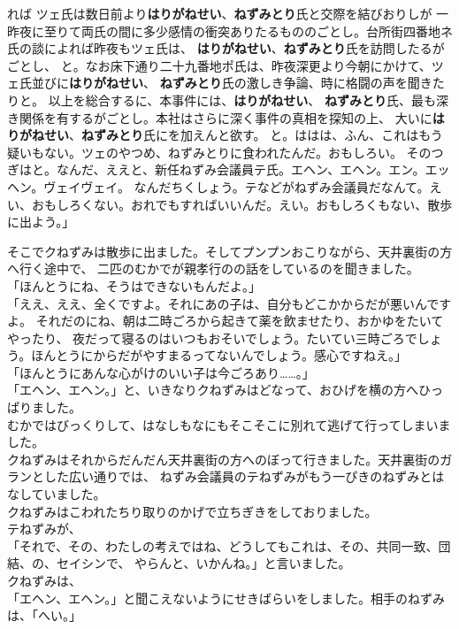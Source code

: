 \documentclass[
    a4paper,
    10pt,
    book]
    {tarticle}
\begin{document}
\newpage
\thispagestyle{fancy}
\fancyhead[R]{\empty}
れば
ツェ氏は数日前より\textbf{はりがねせい}、\textbf{ねずみとり}氏と交際を結びおりしが
一昨夜に至りて両氏の間に多少感情の衝突ありたるもののごとし。台所街四番地ネ氏の談によれば昨夜もツェ氏は、
\textbf{はりがねせい}、\textbf{ねずみとり}氏を訪問したるがごとし、
と。なお床下通り二十九番地ポ氏は、昨夜深更より今朝にかけて、ツェ氏並びに\textbf{はりがねせい}、
\textbf{ねずみとり}氏の激しき争論、時に格闘の声を聞きたりと。
以上を総合するに、本事件には、\textbf{はりがねせい}、
\textbf{ねずみとり}氏、最も深き関係を有するがごとし。本社はさらに深く事件の真相を探知の上、
大いに\textbf{はりがねせい}、\textbf{ねずみとり}氏にを加えんと欲す。
と。ははは、ふん、これはもう疑いもない。ツェのやつめ、ねずみとりに食われたんだ。おもしろい。
そのつぎはと。なんだ、ええと、新任ねずみ会議員テ氏。エヘン、エヘン。エン。エッヘン。ヴェイヴェイ。
なんだちくしょう。テなどがねずみ会議員だなんて。えい、おもしろくない。おれでもすればいいんだ。えい。おもしろくもない、散歩に出よう。」

\newpage
\thispagestyle{fancy}
\fancyhead[C]{\empty}
\indent そこでクねずみは散歩に出ました。そしてプンプンおこりながら、天井裏街の方へ行く途中で、
二匹のむかでが親孝行のの話をしているのを聞きました。\indent \\
「ほんとうにね、そうはできないもんだよ。」\\
「ええ、ええ、全くですよ。それにあの子は、自分もどこかからだが悪いんですよ。
それだのにね、朝は二時ごろから起きて薬を飲ませたり、おかゆをたいてやったり、
夜だって寝るのはいつもおそいでしょう。たいてい三時ごろでしょう。ほんとうにからだがやすまるってないんでしょう。感心ですねえ。」\\
「ほんとうにあんな心がけのいい子は今ごろあり……。」\\
「エヘン、エヘン。」と、いきなりクねずみはどなって、おひげを横の方へひっぱりました。\\
\indent むかではびっくりして、はなしもなにもそこそこに別れて逃げて行ってしまいました。\\
\indent クねずみはそれからだんだん天井裏街の方へのぼって行きました。天井裏街のガランとした広い通りでは、
ねずみ会議員のテねずみがもう一ぴきのねずみとはなしていました。\\
\indent クねずみはこわれたちり取りのかげで立ちぎきをしておりました。\\
\indent テねずみが、\\
「それで、その、わたしの考えではね、どうしてもこれは、その、共同一致、団結、の、セイシンで、
やらんと、いかんね。」と言いました。\\
\indent クねずみは、\\
「エヘン、エヘン。」と聞こえないようにせきばらいをしました。相手のねずみは、「へい。」
\end{document}
